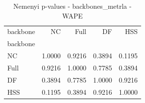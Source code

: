 \begin{table}
\caption{Nemenyi p-values - backbones_metrla - WAPE}
\label{tab:nemenyi_backbones_metrla_wape}
\begin{tabular}{lrrrr}
\toprule
backbone & NC & Full & DF & HSS \\
backbone &  &  &  &  \\
\midrule
NC & 1.0000 & 0.9216 & 0.3894 & 0.1195 \\
Full & 0.9216 & 1.0000 & 0.7785 & 0.3894 \\
DF & 0.3894 & 0.7785 & 1.0000 & 0.9216 \\
HSS & 0.1195 & 0.3894 & 0.9216 & 1.0000 \\
\bottomrule
\end{tabular}
\end{table}
